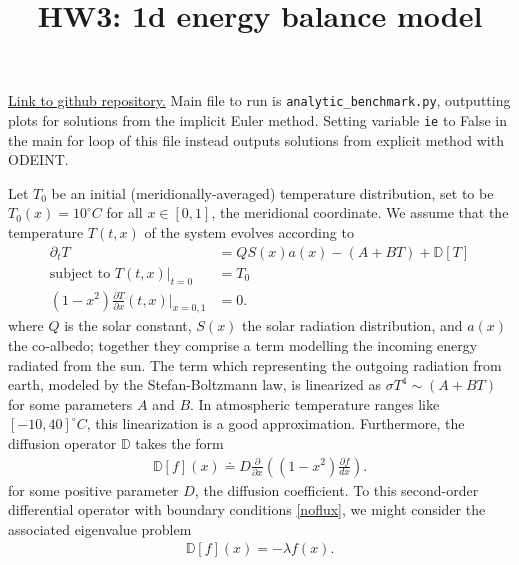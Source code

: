 \documentclass{article}
\title{HW3: 1d energy balance model}
\theoremstyle{remark}
\newcommand{\D}{ \partial }
\begin{document}
\maketitle

\href{https://github.com/jordanradke/energy_balance}{Link to github repository.} Main file to run
is \verb+analytic_benchmark.py+, outputting plots for solutions from the implicit Euler method.
Setting variable \verb+ie+ to False in the main for loop of this file instead outputs solutions
from explicit method with ODEINT.


Let $T_0$ be an initial (meridionally-averaged) temperature distribution, set to be 
$T_0(x) = 10^\circ C$ for all $x \in [0,1]$, the meridional coordinate. We assume that
the temperature $T(t,x)$ of the system evolves according to
\begin{align}
	\D_t T & = QS(x)a(x) - (A+BT) + \mathbb{D}[T]	\label{heat_eq} \\
	\text{subject to } T(t,x)\Big|_{t=0} & = T_0		\label{ic}		\\
	(1-x^2)\frac{\D T}{\D x}(t,x)\Big|_{x=0,1} & = 0	\label{noflux}.
\end{align}
where $Q$ is the solar constant, $S(x)$ the solar radiation distribution, and $a(x)$
the co-albedo; together they comprise a term modelling the incoming energy radiated from the sun. 
The term which representing the outgoing radiation from earth,
modeled by the Stefan-Boltzmann law, is linearized as $\sigma T^4 \sim (A+BT)$ for some 
parameters $A$ and $B$. In atmospheric temperature ranges like $[-10,40]^\circ C$,
this linearization is a good approximation. Furthermore, the diffusion operator $\mathbb{D}$
takes the form
\begin{align}
	\mathbb{D}[f](x) \doteq D\frac{\D}{\D x}\left( (1-x^2) \frac{\D f}{dx} \right).
\end{align}
for some positive parameter $D$, the diffusion coefficient.
To this second-order differential operator with boundary conditions \eqref{noflux}, 
we might consider the associated eigenvalue problem
\begin{align}\label{eigenvalue_prob}
	\mathbb{D}[f](x) = -\lambda f(x).
\end{align}
\end{document}
